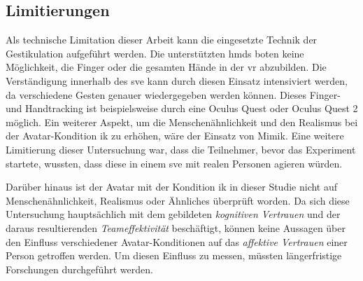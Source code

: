 \documentclass[a4paper,11pt]{article}%
\renewcommand{\\}{\vspace*{0.5\baselineskip} \newline}
\begin{document}
{{%
%			



\subsection{Limitierungen}
Als technische Limitation dieser Arbeit kann die eingesetzte Technik der Gestikulation aufgeführt werden. Die unterstützten \ac{hmd}s boten keine Möglichkeit, die Finger oder die gesamten Hände in der \ac{vr} abzubilden. Die Verständigung innerhalb des \ac{sve} kann durch diesen Einsatz intensiviert werden, da verschiedene Gesten genauer wiedergegeben werden können. Dieses Finger- und Handtracking ist beispielsweise durch eine Oculus Quest oder Oculus Quest 2 möglich. Ein weiterer Aspekt, um die Menschenähnlichkeit und den Realismus bei der Avatar-Kondition \ac{ik} zu erhöhen, wäre der Einsatz von Mimik.
Eine weitere Limitierung dieser Untersuchung war, dass die Teilnehmer, bevor das Experiment startete, wussten, dass diese in einem \ac{sve} mit realen Personen agieren würden. 

Darüber hinaus ist der Avatar mit der Kondition \ac{ik} in dieser Studie nicht auf Menschenähnlichkeit, Realismus oder Ähnliches überprüft worden. 
Da sich diese Untersuchung hauptsächlich mit dem gebildeten \textit{kognitiven Vertrauen} und der daraus resultierenden \textit{Teameffektivität} beschäftigt, können keine Aussagen über den Einfluss verschiedener Avatar-Konditionen auf das \textit{affektive Vertrauen} einer Person getroffen werden. Um diesen Einfluss zu messen, müssten längerfristige Forschungen durchgeführt werden.


%

}}
\end{document}
